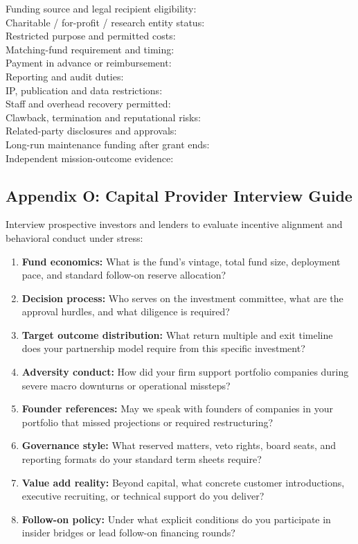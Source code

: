 \begin{tcolorbox}[colback=BayesCanvas,colframe=BayesDark,arc=1mm,title=\textbf{Appendix N: Grant and Philanthropic Funding Dossier}]
\scriptsize\ttfamily
Funding source and legal recipient eligibility:\\
Charitable / for-profit / research entity status:\\
Restricted purpose and permitted costs:\\
Matching-fund requirement and timing:\\
Payment in advance or reimbursement:\\
Reporting and audit duties:\\
IP, publication and data restrictions:\\
Staff and overhead recovery permitted:\\
Clawback, termination and reputational risks:\\
Related-party disclosures and approvals:\\
Long-run maintenance funding after grant ends:\\
Independent mission-outcome evidence:
\end{tcolorbox}

\subsection{Appendix O: Capital Provider Interview Guide}

Interview prospective investors and lenders to evaluate incentive alignment and behavioral conduct under stress:

\begin{enumerate}
    \item \textbf{Fund economics:} What is the fund's vintage, total fund size, deployment pace, and standard follow-on reserve allocation?
    \item \textbf{Decision process:} Who serves on the investment committee, what are the approval hurdles, and what diligence is required?
    \item \textbf{Target outcome distribution:} What return multiple and exit timeline does your partnership model require from this specific investment?
    \item \textbf{Adversity conduct:} How did your firm support portfolio companies during severe macro downturns or operational missteps?
    \item \textbf{Founder references:} May we speak with founders of companies in your portfolio that missed projections or required restructuring?
    \item \textbf{Governance style:} What reserved matters, veto rights, board seats, and reporting formats do your standard term sheets require?
    \item \textbf{Value add reality:} Beyond capital, what concrete customer introductions, executive recruiting, or technical support do you deliver?
    \item \textbf{Follow-on policy:} Under what explicit conditions do you participate in insider bridges or lead follow-on financing rounds?
\end{enumerate}

